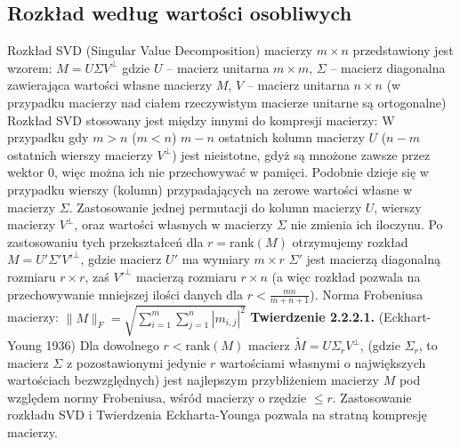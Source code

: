 \documentclass{pracamgr}
\begin{document}
   \subsection{Rozkład według wartości osobliwych}
    Rozkład SVD (Singular Value Decomposition) macierzy $m\times n$ przedstawiony jest wzorem:
    $M=U\Sigma V^\bot$\newline
    gdzie $U$ -- macierz unitarna $m\times m$, $\Sigma$ -- macierz diagonalna zawierająca wartości własne macierzy $M$,
    $V$ -- macierz unitarna $n\times n$\newline
    (w przypadku macierzy nad ciałem rzeczywistym macierze unitarne są ortogonalne)\newline\newline
    Rozkład SVD stosowany jest między innymi do kompresji macierzy:\newline
    W przypadku gdy $m>n$ ($m<n$) $m-n$ ostatnich kolumn macierzy $U$ ($n-m$ ostatnich wierszy macierzy $V^\bot$) jest nieistotne,
    gdyż są mnożone zawsze przez wektor $0$, więc można ich nie przechowywać w pamięci.\newline
    Podobnie dzieje się w przypadku wierszy (kolumn) przypadających na zerowe wartości własne w macierzy $\Sigma$.\newline
    Zastosowanie jednej permutacji do kolumn macierzy $U$, wierszy macierzy $V^\bot$, oraz wartości własnych w macierzy $\Sigma$ nie zmienia ich iloczynu.\newline
    Po zastosowaniu tych przekształceń dla $r=$rank$(M)$ otrzymujemy rozkład $M=U'\Sigma'V'^\bot$, gdzie macierz $U'$ ma wymiary $m\times r$ $\Sigma'$
    jest macierzą diagonalną rozmiaru $r\times r$, zaś $V'^\bot$ macierzą rozmiaru $r\times n$
    (a więc rozkład pozwala na przechowywanie mniejszej ilości danych dla $r<\frac{mn}{m+n+1}$).\newline
    Norma Frobeniusa macierzy: $\lVert M \rVert_F=\sqrt{\sum\limits_{i=1}^{m}\sum\limits_{j=1}^{n}|m_{i,j}|^2}$\newline
    \textbf{Twierdzenie 2.2.2.1.} (Eckhart-Young 1936) Dla dowolnego $r<$rank$(M)$
    macierz $\tilde{M}=U\Sigma_r V^\bot$,
    (gdzie $\Sigma_r$, to macierz $\Sigma$ z pozostawionymi jedynie $r$ wartościami własnymi o największych wartościach bezwzględnych)
    jest najlepszym przybliżeniem macierzy $M$ pod względem normy Frobeniusa, wśród macierzy o rzędzie $\le r$.\newline
    Zastosowanie rozkładu SVD i Twierdzenia Eckharta-Younga pozwala na stratną kompresję macierzy.
\end{document}
